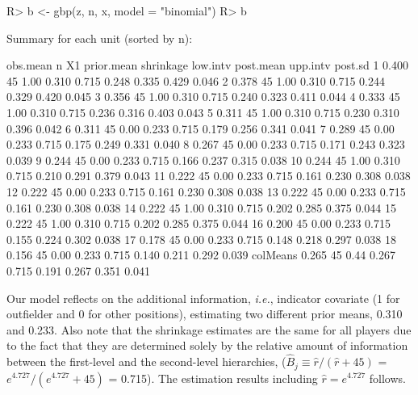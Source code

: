 \documentclass[article]{jss}
\begin{document}
\begin{CodeChunk}
\begin{CodeInput}
R> b <- gbp(z, n, x, model = "binomial")
R> b
\end{CodeInput}
\begin{CodeOutput}
Summary for each unit (sorted by n):

         obs.mean  n   X1 prior.mean shrinkage low.intv post.mean upp.intv post.sd
1           0.400 45 1.00      0.310     0.715    0.248     0.335    0.429   0.046
2           0.378 45 1.00      0.310     0.715    0.244     0.329    0.420   0.045
3           0.356 45 1.00      0.310     0.715    0.240     0.323    0.411   0.044
4           0.333 45 1.00      0.310     0.715    0.236     0.316    0.403   0.043
5           0.311 45 1.00      0.310     0.715    0.230     0.310    0.396   0.042
6           0.311 45 0.00      0.233     0.715    0.179     0.256    0.341   0.041
7           0.289 45 0.00      0.233     0.715    0.175     0.249    0.331   0.040
8           0.267 45 0.00      0.233     0.715    0.171     0.243    0.323   0.039
9           0.244 45 0.00      0.233     0.715    0.166     0.237    0.315   0.038
10          0.244 45 1.00      0.310     0.715    0.210     0.291    0.379   0.043
11          0.222 45 0.00      0.233     0.715    0.161     0.230    0.308   0.038
12          0.222 45 0.00      0.233     0.715    0.161     0.230    0.308   0.038
13          0.222 45 0.00      0.233     0.715    0.161     0.230    0.308   0.038
14          0.222 45 1.00      0.310     0.715    0.202     0.285    0.375   0.044
15          0.222 45 1.00      0.310     0.715    0.202     0.285    0.375   0.044
16          0.200 45 0.00      0.233     0.715    0.155     0.224    0.302   0.038
17          0.178 45 0.00      0.233     0.715    0.148     0.218    0.297   0.038
18          0.156 45 0.00      0.233     0.715    0.140     0.211    0.292   0.039
colMeans    0.265 45 0.44      0.267     0.715    0.191     0.267    0.351   0.041
\end{CodeOutput}
\end{CodeChunk}
Our model reflects on the additional information, \emph{i.e.}, indicator covariate (1 for outfielder and 0 for other positions), estimating two different prior means, 0.310 and 0.233. Also note that the shrinkage estimates are the same for all players due to the fact that they are determined solely by the relative amount of information between the first-level and the second-level hierarchies, ($\hat{B}_{j}\equiv \hat{r} / (\hat{r}+45)$ = $e^{4.727} / (e^{4.727}+45)$ = 0.715). The estimation results including $\hat{r}=e^{4.727}$ follows.
\end{document}
